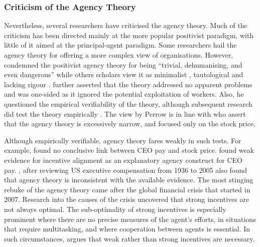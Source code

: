 \documentclass[a4paper,nobind]{templates/ociamthesis}
\begin{document}
\hypertarget{criticism-of-the-agency-theory}{%
\subsubsection{Criticism of the Agency Theory}\label{criticism-of-the-agency-theory}}

Nevertheless, several researchers have criticised the agency theory. Much of the criticism has been directed mainly at the more popular positivist paradigm, with little of it aimed at the principal-agent paradigm. Some researchers hail the agency theory for offering a more complex view of organisations. However, \textcite{perrow1986complex} condemned the positivist agency theory for being ``trivial, dehumanising, and even dangerous'' \textcite{eisenhardt1989agency} while others scholars view it as minimalist \autocite{hirsch1986collaboration}, tautological and lacking rigour \autocite{jensen1983organization}. \textcite{perrow1986complex} further asserted that the theory addressed no apparent problems and was one-sided as it ignored the potential exploitation of workers. Also, he questioned the empirical verifiability of the theory, although subsequent research did test the theory empirically \autocite{eisenhardt1989agency}. The view by Perrow is in line with \textcite{hirsch1986collaboration} who assert that the agency theory is excessively narrow, and focused only on the stock price.

Although empirically verifiable, agency theory fares weakly in such tests. For example, \textcite{jensen1990performance} found no conclusive link between CEO pay and stock price. \textcite{frydman2010ceo} found weak evidence for incentive alignment as an explanatory agency construct for CEO pay. \textcite{tosi2000much}, after reviewing US executive compensation from 1936 to 2005 also found that agency theory is inconsistent with the available evidence. The most stinging rebuke of the agency theory came after the global financial crisis that started in 2007. Research into the causes of the crisis uncovered that strong incentives are not always optimal. The sub-optimality of strong incentives is especially prominent where there are no precise measures of the agent's efforts, in situations that require multitasking, and where cooperation between agents is essential. In such circumstances,\textcite{roberts2010designing} argues that weak rather than strong incentives are necessary.
\end{document}
